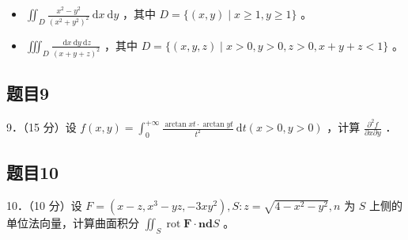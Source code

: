 \documentclass{article}
\begin{document}
\begin{itemize}
  \item[（1）] \(\iint_{D} \frac{x^{2}-y^{2}}{\left(x^{2}+y^{2}\right)^{2}} \mathrm{~d} x \mathrm{~d} y\) ，其中 \(D=\{(x, y) \mid x \geq 1, y \geq 1\}\) 。
  \item[（2）] \(\iiint_{D} \frac{\mathrm{~d} x \mathrm{~d} y \mathrm{~d} z}{(x+y+z)^{2}}\) ，其中 \(D=\{(x, y, z) \mid x>0, y>0, z>0, x+y+z<1\}\) 。
\end{itemize}

\subsection{题目9}
9．（15 分）设 \(f(x, y)=\int_{0}^{+\infty} \frac{\arctan x t \cdot \arctan y t}{t^{2}} \mathrm{~d} t(x>0, y>0)\) ，计算 \(\frac{\partial^{2} f}{\partial x \partial y}\) ．

\subsection{题目10}
10．（10 分）设 \(F=\left(x-z, x^{3}-y z,-3 x y^{2}\right), S: z=\sqrt{4-x^{2}-y^{2}}, n\) 为 \(S\) 上侧的单位法向量，计算曲面积分 \(\iint_{S} \operatorname{rot} \mathbf{F} \cdot \mathbf{n d} S\) 。
\end{document}
